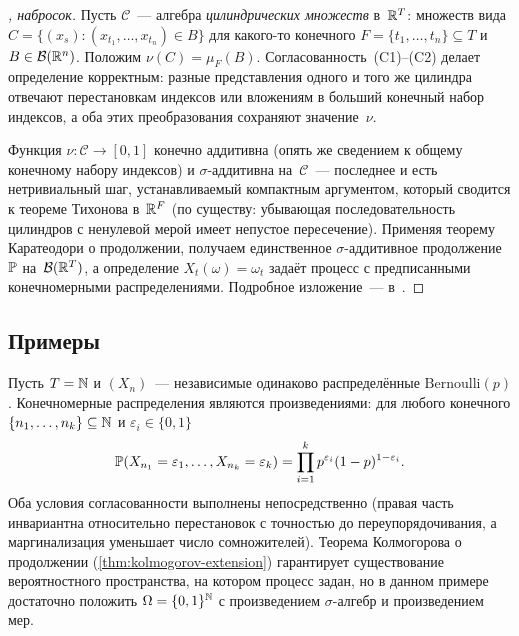 \begin{proof}[, набросок]
Пусть $\mathcal{C}$~--- алгебра \emph{цилиндрических множеств} в~$\mathbb{R}^T$: множеств вида $C = \{(x_s) : (x_{t_1}, \dots, x_{t_n}) \in B\}$ для какого-то конечного $F = \{t_1, \dots, t_n\} \subseteq T$ и $B \in \mathcal{B}(\mathbb{R}^n)$. Положим $\nu(C) = \mu_F(B)$. Согласованность~(C1)--(C2) делает определение корректным: разные представления одного и того же цилиндра отвечают перестановкам индексов или вложениям в больший конечный набор индексов, а оба этих преобразования сохраняют значение~$\nu$.

Функция $\nu \colon \mathcal{C} \to [0, 1]$ конечно аддитивна (опять же сведением к общему конечному набору индексов) и $\sigma$-аддитивна на~$\mathcal{C}$~--- последнее и есть нетривиальный шаг, устанавливаемый компактным аргументом, который сводится к теореме Тихонова в~$\mathbb{R}^F$ (по существу: убывающая последовательность цилиндров с ненулевой мерой имеет непустое пересечение). Применяя теорему Каратеодори о продолжении, получаем единственное $\sigma$-аддитивное продолжение~$\mathbb{P}$ на~$\mathcal{B}(\mathbb{R}^T)$, а определение $X_t(\omega) = \omega_t$ задаёт процесс с предписанными конечномерными распределениями. Подробное изложение~--- в~\cite[гл.~II, \S~3]{Shiryaev1989}.
\end{proof}

\subsection*{Примеры}

\begin{example}
\label{ex:bernoulli-process}
Пусть $T = \mathbb{N}$ и $(X_n)$~--- независимые одинаково распределённые $\mathrm{Bernoulli}(p)$. Конечномерные распределения являются произведениями: для любого конечного $\{n_1, \dots, n_k\} \subseteq \mathbb{N}$ и $\varepsilon_i \in \{0, 1\}$
\[
  \mathbb{P}(X_{n_1} = \varepsilon_1, \dots, X_{n_k} = \varepsilon_k) = \prod_{i=1}^{k} p^{\varepsilon_i} (1 - p)^{1 - \varepsilon_i}.
\]
Оба условия согласованности выполнены непосредственно (правая часть инвариантна относительно перестановок с точностью до переупорядочивания, а маргинализация уменьшает число сомножителей). Теорема Колмогорова о продолжении (\cref{thm:kolmogorov-extension}) гарантирует существование вероятностного пространства, на котором процесс задан, но в данном примере достаточно положить $\Omega = \{0,1\}^{\mathbb{N}}$ с произведением $\sigma$-алгебр и произведением мер.
\end{example}

